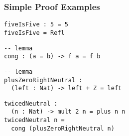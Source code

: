 \begin{frame}[fragile]
\frametitle{Simple Proof Examples}

\begin{lstlisting}[frame=single]
fiveIsFive : 5 = 5
fiveIsFive = Refl
\end{lstlisting}
\begin{lstlisting}[frame=single]
-- lemma
cong : (a = b) -> f a = f b
\end{lstlisting}
\begin{lstlisting}[frame=single]
-- lemma
plusZeroRightNeutral :
  (left : Nat) -> left + Z = left
\end{lstlisting}
\begin{lstlisting}[frame=single]
twicedNeutral :
  (n : Nat) -> mult 2 n = plus n n
twicedNeutral n =
  cong (plusZeroRightNeutral n)
\end{lstlisting}

\end{frame}
